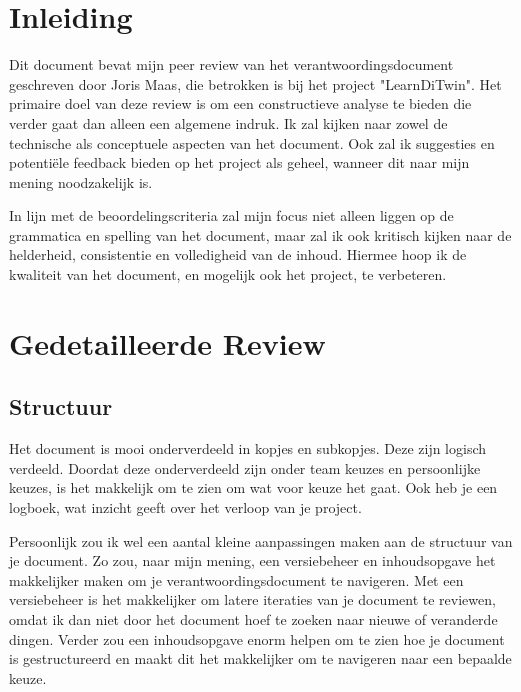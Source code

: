 \documentclass[a4paper]{report}
\begin{document}
\chapter{Inleiding}
Dit document bevat mijn peer review van het verantwoordingsdocument geschreven door Joris Maas, die betrokken is bij het project "LearnDiTwin". 
Het primaire doel van deze review is om een constructieve analyse te bieden die verder gaat dan alleen een algemene indruk. 
Ik zal kijken naar zowel de technische als conceptuele aspecten van het document. Ook zal ik suggesties en potentiële feedback bieden op het project als geheel, wanneer dit naar mijn mening noodzakelijk is.
\par \smallskip
In lijn met de beoordelingscriteria zal mijn focus niet alleen liggen op de grammatica en spelling van het document, maar zal ik ook kritisch kijken naar de helderheid, consistentie en volledigheid van de inhoud.
Hiermee hoop ik de kwaliteit van het document, en mogelijk ook het project, te verbeteren.


\chapter{Gedetailleerde Review}
\section{Structuur}
Het document is mooi onderverdeeld in kopjes en subkopjes. Deze zijn logisch verdeeld. 
Doordat deze onderverdeeld zijn onder team keuzes en persoonlijke keuzes, is het makkelijk om te zien om wat voor keuze het gaat.
Ook heb je een logboek, wat inzicht geeft over het verloop van je project.
\par\smallskip 
Persoonlijk zou ik wel een aantal kleine aanpassingen maken aan de structuur van je document. 
Zo zou, naar mijn mening, een versiebeheer en inhoudsopgave het makkelijker maken om je verantwoordingsdocument te navigeren.
Met een versiebeheer is het makkelijker om latere iteraties van je document te reviewen, omdat ik dan niet door het document hoef te zoeken naar nieuwe of veranderde dingen.
Verder zou een inhoudsopgave enorm helpen om te zien hoe je document is gestructureerd en maakt dit het makkelijker om te navigeren naar een bepaalde keuze.
\end{document}
